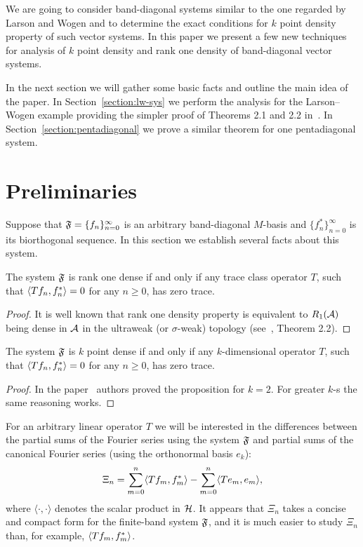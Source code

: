 \documentclass[12pt]{amsart}
\theoremstyle{case}
\begin{document}
    We are going to consider band-diagonal systems similar to the one regarded by Larson and Wogen and to determine the exact conditions
      for $k$ point density property of such vector systems.
    In this paper we present a few new techniques for analysis of $k$ point density and rank one density of band-diagonal vector systems.

    In the next section we will gather some basic facts and outline the main idea of the paper.
    In Section~\ref{section:lw-sys} we perform the analysis for the Larson--Wogen example providing the simpler proof of Theorems 2.1 and 2.2 in~\cite{katavolos}.
    In Section~\ref{section:pentadiagonal} we prove a similar theorem for one pentadiagonal system.
\section{Preliminaries}
  \label{sec:preliminaries}
  Suppose that $\fsys=\{f_n\}_{n=0}^\infty$ is an arbitrary band-diagonal $M$-basis and $\{f^*_n\}_{n=0}^\infty$ is its biorthogonal sequence.
  In this section we establish several facts about this system.
  \begin{prop}
    The system $\fsys$ is rank one dense if and only if any trace class operator $T$,
      such that $\inner{Tf_n}{f_n^*} = 0$ for any $n \geq 0$, has  zero trace.
  \end{prop}
  \begin{proof}
    It is well known that rank one density property is equivalent to $R_1(\cal{A})$ being dense
      in $\cal{A}$ in the ultraweak (or $\sigma$-weak) topology (see~\cite{katavolos}, Theorem 2.2).
  \end{proof}
  \begin{prop}
    The system $\fsys$ is $k$ point dense if and only if any $k$-dimensional operator $T$,
      such that $\inner{Tf_n}{f_n^*} = 0$ for any $n \geq 0$, has  zero trace.
  \end{prop}
  \begin{proof}
    In the paper~\cite{katavolos} authors proved the proposition for $k = 2$.
    For greater $k$-s the same reasoning works.
  \end{proof}
  For an arbitrary linear operator $T$ we will be interested in the differences between
    the partial sums of the Fourier series using the system $\fsys$ and
    partial sums of the canonical Fourier series (using the orthonormal basis $e_k$):
  \begin{equation}
    \label{eq:xi}
    \Xi_n = \sum_{m=0}^n \inner{Tf_m}{f_m^*} - \sum_{m=0}^n \inner{Te_m}{e_m},
  \end{equation}
    where $\langle \cdot, \cdot\rangle$ denotes the scalar product in $\cal{H}$.
  It appears that $\Xi_n$ takes a concise and compact form for the finite-band system $\fsys$, and it is much easier to study $\Xi_n$
    than, for example, $\inner{Tf_m}{f_m^*}$.
\end{document}
